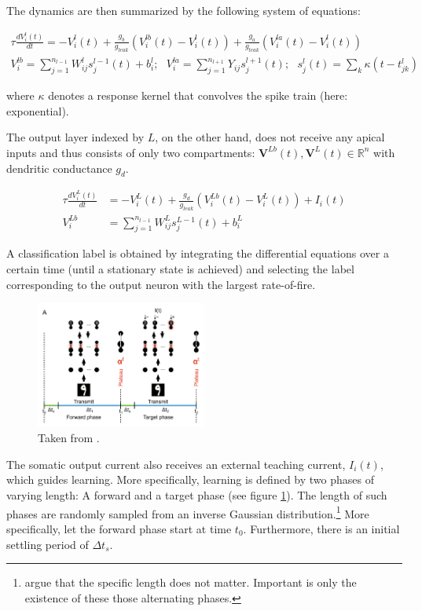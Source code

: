 \documentclass[colorinlistoftodos]{article}
\theoremstyle{definition}
\def\R{\mathbb{R}}
\begin{document}
The dynamics are then summarized by the following system of equations:

	\begin{align*}
		\tau \frac{dV_i^l(t)}{dt} = -V_i^l(t) + \frac{g_b}{g_{leak}}\left(V_i^{lb}(t) - V_i^l(t)\right) +\frac{g_a}{g_{leak}}\left(V_i^{la}(t) - V_i^l(t)\right)\\
		V_i^{lb} = \sum_{j=1}^{n_{l-1}} W_{ij}^l s_j^{l-1}(t) + b_i^l; \ \ \ V_i^{la} = \sum_{j=1}^{n_{l+1}} Y_{ij} s^{l+1}_j(t); \ \ \
		s_j^{l}(t) = \sum_k \kappa(t-t_{jk}^{l})
	\end{align*}

where $\kappa$ denotes a response kernel that convolves the spike train (here: exponential).
	
The output layer indexed by $L$, on the other hand, does not receive any apical inputs and thus consists of only two compartments: $\mathbf{V}^{Lb}(t), \mathbf{V}^{L}(t) \in \R^n$ with dendritic conductance $g_d$. 

\begin{align*}
		\tau \frac{dV_i^L(t)}{dt} &= -V_i^L(t) + \frac{g_d}{g_{leak}}\left(V_i^{Lb}(t) - V_i^L(t) \right) + I_i(t)\\
		V_i^{Lb} &= \sum_{j=1}^{n_{l-1}} W_{ij}^L s_j^{L-1}(t) + b_i^L
\end{align*}

A classification label is obtained by integrating the differential equations over a certain time (until a stationary state is achieved) and selecting the label corresponding to the output neuron with the largest rate-of-fire. 
	
\begin{figure}
\centering
\includegraphics[width=0.5\textwidth]{../figures/report/phases}
\caption{\label{fig:phases} Taken from \citet{guerguiev2017}.}
\end{figure}

The somatic output current also receives an external teaching current, $I_i(t)$, which guides learning. More specifically, learning is defined by two phases of varying length: A forward and a target phase (see figure \ref{fig:phases}). The length of such phases are randomly sampled from an inverse Gaussian distribution.\footnote{\citet{guerguiev2017} argue that the specific length does not matter. Important is only the existence of these those alternating phases.}
More specifically, let the forward phase start at time $t_0$. Furthermore, there is an initial settling period of $\Delta t_s$.
 
\end{document}
